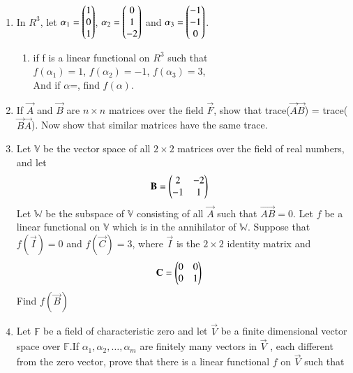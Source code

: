 \renewcommand{\theequation}{\theenumi}
\renewcommand{\thefigure}{\theenumi}
\begin{enumerate}[label=\thesubsection.\arabic*.,ref=\thesubsection.\theenumi]


\item In $R^3$, let $\alpha_1 = \begin{pmatrix}1\\0\\1\end{pmatrix}$, $\alpha_2 =\begin{pmatrix}0\\1\\-2\end{pmatrix}$ and 
$\alpha_3 =\begin{pmatrix}-1\\-1\\0\end{pmatrix}$. 

\begin{enumerate}
\item if f is a linear functional on $R^3$ such that\\ $f(\alpha_1)=1$, $f(\alpha_2)=-1$,  $f(\alpha_3)=3$,\\ And if $\alpha$=, find $f(\alpha)$.
%
\\
\solution

\end{enumerate}
%
\item If $\vec{A}$ and $\vec{B}$ are $n\times n$ matrices over the field $\vec{F}$, show that trace($\vec{A}\vec{B}$) = trace($\vec{B}\vec{A}$). Now show that similar matrices have the same trace. 
%
\\
\solution

\item Let $\mathbb{V}$ be the vector space of all $2 \times 2$ matrices over the field of real numbers, and let
\begin{align}
\mathbf{B} &= \begin{pmatrix}2&-2\\-1&1\end{pmatrix}
\end{align}
Let $\mathbb{W}$ be the subspace of $\mathbb{V}$ consisting of all $\vec{A}$ such that $\vec{AB} = 0$. Let $f$ be a linear functional on $\mathbb{V}$ which is in the annihilator of $\mathbb{W}$. Suppose that $f(\vec{I}) = 0$ and $f(\vec{C}) = 3$, where $\vec{I}$ is the $2 \times 2$ identity matrix and
\begin{align}
\mathbf{C} &= \begin{pmatrix}0&0\\0&1\end{pmatrix}
\end{align}
Find $f(\vec{B})$
%
\\
\solution
%
\item Let $\mathbb{F}$ be a field of characteristic zero and let $\vec{V}$ be a finite dimensional vector space over  $\mathbb{F}$.If $\alpha_1,\alpha_2,\hdots,\alpha_m$ are finitely many vectors in $\vec{V}$ , each different from the zero vector, prove that there is a linear functional $f$ on $\vec{V}$ such that

\end{enumerate}
